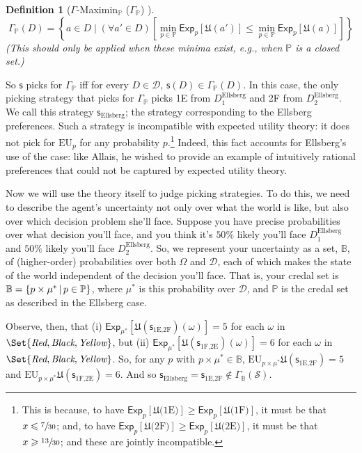 \documentclass[a4paper]{article}
\newtheorem{definition}{Definition}
\renewcommand\P{\mathbb{P}} %
\newcommand\Exp{\mathsf{Exp}}
\newcommand\EU{\mathrm{EU}}
\newcommand\U{\mathfrak{U}} %
\newcommand\Maximin{\Gamma}
\newcommand{\D}{\mathcal{D}}
\renewcommand\S{\mathcal{S}}
\newcommand\s{\mathsf{s}}
\newcommand{\IB}{\mathbb{B}}
\newcommand{\IP}{\P}
\newcommand\SetDelimiter[1][]{
	\nonscript\,#1\vert \allowbreak \nonscript\,\mathopen{}}
\providecommand\given{\SetDelimiter}
\renewcommand{\leq}{\leqslant}
\renewcommand{\geq}{\geqslant}
\newenvironment{CCM rewritten}
{\begingroup\color{blue}} %
{\endgroup}              %
\begin{document}
\begin{definition}[$\Gamma$-Maximin$_\IP$ ($\Maximin_\IP$) ]
$$
\Maximin_\IP(D) = \left \{ a \in D \mid (\forall a' \in D)\left [\min_{p \in \IP} \Exp_p[\U(a')] \leq \min_{p \in \IP} \Exp_p[\U(a)] \right ] \right \}
$$
(This should only be applied when these minima exist, e.g., when $\IP$ is a closed set.)
\end{definition}

So $\s$ picks for $\Maximin_\IP$ iff for every $D\in\D$, $\s(D)\in\Maximin_\IP(D)$. In this case, the only picking strategy that picks for $\Maximin_\IP$ picks 1E from $D^{\mathrm{Ellsberg}}_1$ and 2F from $D^{\mathrm{Ellsberg}}_2$. We call this strategy $\s_{\mathrm{Ellsberg}}$; the strategy corresponding to the Ellsberg preferences. Such a strategy is incompatible with expected utility theory: it does not pick for $\EU_p$ for any probability $p$.\footnote{\label{ftnte:Ellsberg not EU}This is because, to have $\Exp_p[\U(\text{1E)}]\geq \Exp_p[\U(\text{1F)}]$, it must be that $x\leq \sfrac{7}{30}$; and, to have  $\Exp_p[\U(\text{2F)}]\geq \Exp_p[\U(\text{2E)}]$, it must be that $x\geq \sfrac{13}{30}$; and these are jointly incompatible. } Indeed, this fact accounts for Ellsberg's use of the case: like Allais, he wished to provide an example of intuitively rational preferences that could not be captured by expected utility theory. 

Now we will use the theory itself to judge picking strategies. To do this, we need to describe the agent's uncertainty not only over what the world is like, but also over which decision problem she'll face. 
Suppose you have precise probabilities over what decision you'll face, and you think it's $50\%$ likely you'll face $D^{\mathrm{Ellsberg}}_1$ and $50\%$ likely you'll face $D^{\mathrm{Ellsberg}}_2$. 
So, we represent your uncertainty as a set, $\IB$, of (higher-order) probabilities over both $\Omega$ and $\D$, each of which makes the state of the world independent of the decision you'll face. 
{That is, your credal set is $\IB=\{p\times\mu^* \given p\in\IP\}$, where $\mu^*$ is this probability over $\D$, and $\IP$ is the credal set as described in the Ellsberg case.}

Observe, then, that (i) $\Exp_{\mu^*}[\U(\s_{\text{1E,2F}})(\omega)]=5$ for each $\omega$ in $\Set{\emph{Red}, \emph{Black}, \emph{Yellow}}$, but (ii) $\Exp_{\mu^*}[\U(\s_{\text{1F,2E}})(\omega)]=6$ for each $\omega$ in $\Set{\emph{Red}, \emph{Black}, \emph{Yellow}}$. So, for any $p$ with $p\times \mu^*\in \IB$,  $\EU_{p\times\mu^*}\U(\s_{\text{1E,2F}})=5$ and  $\EU_{p\times\mu^*}\U(\s_{\text{1F,2E}})=6$. And so $\s_{\mathrm{Ellsberg}}=\s_{\text{1E,2F}}\notin\Maximin_{\IB}(\S)$. 
\end{document}
